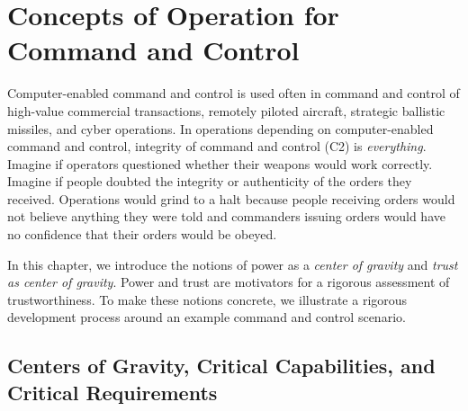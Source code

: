 \chapter{Concepts of Operation for Command and Control}
\label{cha:c2conops}




Computer-enabled command and control is used often in command and
control of high-value commercial transactions, remotely piloted
aircraft, strategic ballistic missiles, and cyber operations. In
operations depending on computer-enabled command and control,
integrity of command and control (C2) is \emph{everything}.  Imagine
if operators questioned whether their weapons would work
correctly. Imagine if people doubted the integrity or authenticity of
the orders they received. Operations would grind to a halt because
people receiving orders would not believe anything they were told and
commanders issuing orders would have no confidence that their orders
would be obeyed.

In this chapter, we introduce the notions of power as a \emph{center
  of gravity} and \emph{trust as center of gravity}. Power and trust
are motivators for a rigorous assessment of trustworthiness. To make
these notions concrete, we illustrate a rigorous development process
around an example command and control scenario.

\section{Centers of Gravity, Critical Capabilities, and Critical
  Requirements}

